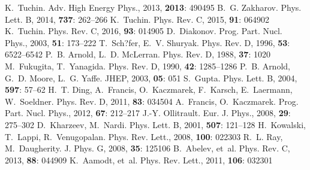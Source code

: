 \documentclass[a4paper,10pt,twoside]{cpc-hepnp}
\begin{document}
\begin{CJK*}{GBK}{song}
\begin{multicols}{2}
\begin{thebibliography}{90}
 K.~Tuchin. Adv. High Energy Phys., 2013, \textbf{2013}: 490495
 B.~G. Zakharov. Phys. Lett. B, 2014, \textbf{737}: 262--266
 K.~Tuchin. Phys. Rev. C, 2015, \textbf{91}: 064902
 K.~Tuchin. Phys. Rev. C, 2016, \textbf{93}: 014905
 D.~Diakonov. Prog. Part. Nucl. Phys., 2003, \textbf{51}: 173--222
 T.~Sch?fer, E.~V. Shuryak. Phys. Rev. D, 1996, \textbf{53}: 6522--6542
 P.~B. Arnold, L.~D. McLerran. Phys. Rev. D, 1988, \textbf{37}: 1020
 M.~Fukugita, T.~Yanagida. Phys. Rev. D, 1990, \textbf{42}: 1285--1286
 P.~B. Arnold, G.~D. Moore, L.~G. Yaffe. JHEP, 2003, \textbf{05}: 051
 S.~Gupta. Phys. Lett. B, 2004, \textbf{597}: 57--62
 H.~T. Ding, A.~Francis, O.~Kaczmarek, F.~Karsch, E.~Laermann, W.~Soeldner. Phys. Rev. D, 2011, \textbf{83}: 034504
 A.~Francis, O.~Kaczmarek. Prog. Part. Nucl. Phys., 2012, \textbf{67}: 212--217
 J.-Y. Ollitrault. Eur. J. Phys., 2008, \textbf{29}: 275--302
 D.~Kharzeev, M.~Nardi. Phys. Lett. B, 2001, \textbf{507}: 121--128
 H.~Kowalski, T.~Lappi, R.~Venugopalan. Phys. Rev. Lett., 2008, \textbf{100}: 022303
 R.~L. Ray, M.~Daugherity. J. Phys. G, 2008, \textbf{35}: 125106
 B.~Abelev, et~al. Phys. Rev. C, 2013, \textbf{88}: 044909
 K.~Aamodt, et~al. Phys. Rev. Lett., 2011, \textbf{106}: 032301

\end{thebibliography}
\end{multicols}

\clearpage

\end{CJK*}
\end{document}
